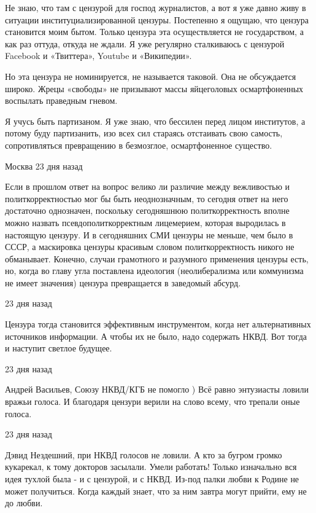 Не знаю, что там с цензурой для господ журналистов, а вот я уже давно живу в
ситуации институциализированной цензуры. Постепенно я ощущаю, что цензура
становится моим бытом. Только цензура эта осуществляется не государством, а как
раз оттуда, откуда не ждали. Я уже регулярно сталкиваюсь с цензурой Facebook и
«Твиттера», Youtube и «Википедии». 

Но эта цензура не номинируется, не называется таковой. Она не обсуждается
широко. Жрецы «свободы» не призывают массы яйцеголовых осмартфоненных воспылать
праведным гневом.

Я учусь быть партизаном. Я уже знаю, что бессилен перед лицом институтов, а
потому буду партизанить, изо всех сил стараясь отстаивать свою самость,
сопротивляться превращению в безмозглое, осмартфоненное существо. 

\begin{itemize}
 Москва 23 дня назад  

Если в прошлом ответ на вопрос велико ли различие между вежливостью и
политкорректностью мог бы быть неоднозначным, то сегодня ответ на него
достаточно однозначен, поскольку сегодняшнюю политкорректность вполне можно
назвать псевдополиткорректным лицемерием, которая выродилась в настоящую
цензуру. И в сегодняшних СМИ цензуры не меньше, чем было в СССР, а маскировка
цензуры красивым словом политкорректность никого не обманывает. Конечно, случаи
грамотного и разумного применения цензуры есть, но, когда во главу угла
поставлена идеология (неолиберализма или коммунизма не имеет значения) цензура
превращается в заведомый абсурд.

 23 дня назад

Цензура тогда становится эффективным инструментом, когда нет альтернативных
источников информации. А чтобы их не было, надо содержать НКВД.  Вот тогда и
наступит светлое будущее.

 23 дня назад

Андрей Васильев, Союзу НКВД/КГБ не помогло ) Всё равно энтузиасты ловили вражьи
голоса. И благодаря цензури верили на слово всему, что трепали оные голоса.

 23 дня назад

Дэвид Нездешний, при НКВД голосов не ловили. А кто за бугром громко кукарекал,
к тому докторов засылали. Умели работать!  Только изначально вся идея тухлой
была - и с цензурой, и с НКВД. Из-под палки любви к Родине не может получиться.
Когда каждый знает, что за ним завтра могут прийти, ему не до любви.


\end{itemize}
